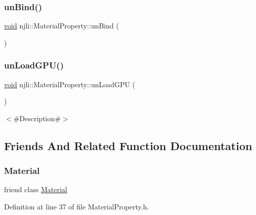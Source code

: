\subsubsection{\texorpdfstring{un\+Bind()}{unBind()}}
{\footnotesize\ttfamily \mbox{\hyperlink{_thread_8h_af1e856da2e658414cb2456cb6f7ebc66}{void}} njli\+::\+Material\+Property\+::un\+Bind (\begin{DoxyParamCaption}{ }\end{DoxyParamCaption})\hspace{0.3cm}{\ttfamily [protected]}}

\mbox{\label{classnjli_1_1_material_property_a26086f9fabd9f206fc89ef9e4d1ab351}} 
\subsubsection{\texorpdfstring{un\+Load\+G\+P\+U()}{unLoadGPU()}}
{\footnotesize\ttfamily \mbox{\hyperlink{_thread_8h_af1e856da2e658414cb2456cb6f7ebc66}{void}} njli\+::\+Material\+Property\+::un\+Load\+G\+PU (\begin{DoxyParamCaption}{ }\end{DoxyParamCaption})}

$<$\#\+Description\#$>$ 

\subsection{Friends And Related Function Documentation}
\mbox{\label{classnjli_1_1_material_property_aa1212b6e372a0f45d2c01f3cd203af77}} 
\subsubsection{\texorpdfstring{Material}{Material}}
{\footnotesize\ttfamily friend class \mbox{\hyperlink{classnjli_1_1_material}{Material}}\hspace{0.3cm}{\ttfamily [friend]}}



Definition at line 37 of file Material\+Property.\+h.

